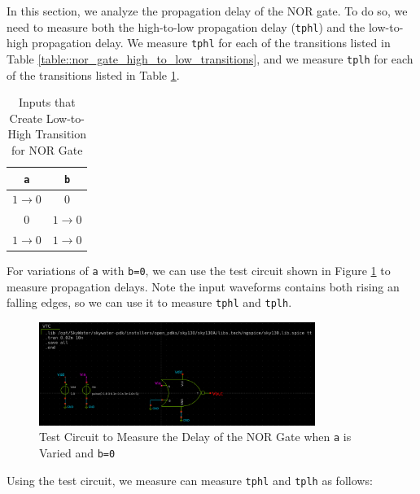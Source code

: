 \documentclass[fleqn]{article}
\begin{document}
	In this section, we analyze the propagation delay of the NOR gate. To do so, we need to measure both the high-to-low propagation delay (\texttt{tphl}) and the low-to-high propagation delay. We measure \texttt{tphl} for each of the transitions listed in Table \ref{table::nor_gate_high_to_low_transitions}, and we measure \texttt{tplh} for each of the transitions listed in Table \ref{table::nor_gate_low_to_high_transitions}.
	
	\begin{table}[H]
	\begin{center}
	\caption{Inputs that Create Low-to-High Transition for NOR Gate}
	\label{table::nor_gate_low_to_high_transitions}
	\begin{tabular}{| c | c |}
		\hline
		\texttt{a} & \texttt{b} \\
		\hline	
		$1 \rightarrow 0$ & $0$\\
		\hline	
		$0$ & $1 \rightarrow 0$\\
		\hline	
		$1 \rightarrow 0$ & $1 \rightarrow 0$\\
		\hline
	\end{tabular}
	\end{center}
	\end{table}
	
	\noindent For variations of \texttt{a} with \texttt{b=0}, we can use the test circuit shown in Figure \ref{fig::nor_delay_test_sweep_va} to measure propagation delays. Note the input waveforms contains both rising an falling edges, so we can use it to measure \texttt{tphl} and \texttt{tplh}.

	\begin{figure}[H]
		\centerline{\includegraphics[width=0.8\textwidth]{nor_delay_test_sweep_va.png}}
		\caption{Test Circuit to Measure the Delay of the NOR Gate when \texttt{a} is Varied and \texttt{b=0}}
		\label{fig::nor_delay_test_sweep_va}
	\end{figure}
	
	\noindent Using the test circuit, we measure can measure \texttt{tphl} and \texttt{tplh} as follows:
	
\end{document}
